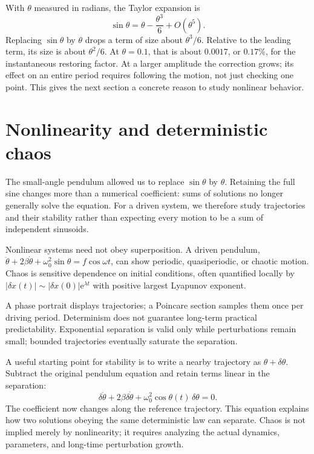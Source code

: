 \documentclass[11pt,oneside]{book}
\newcommand{\ee}{\mathrm{e}}
\theoremstyle{reviewstyle}
\begin{document}
With $\theta$ measured in radians, the Taylor expansion is
\begin{equation}
\sin\theta=\theta-\frac{\theta^3}{6}+O(\theta^5).
\end{equation}
Replacing $\sin\theta$ by $\theta$ drops a term of size about $\theta^3/6$. Relative to the leading term, its size is about $\theta^2/6$. At $\theta=0.1$, that is about $0.0017$, or $0.17\%$, for the instantaneous restoring factor. At a larger amplitude the correction grows; its effect on an entire period requires following the motion, not just checking one point. This gives the next section a concrete reason to study nonlinear behavior.

\section{Nonlinearity and deterministic chaos}
The small-angle pendulum allowed us to replace $\sin\theta$ by $\theta$. Retaining the full sine changes more than a numerical coefficient: sums of solutions no longer generally solve the equation. For a driven system, we therefore study trajectories and their stability rather than expecting every motion to be a sum of independent sinusoids.

Nonlinear systems need not obey superposition. A driven pendulum,
$\ddot\theta+2\beta\dot\theta+\omega_0^2\sin\theta=f\cos\omega t$,
can show periodic, quasiperiodic, or chaotic motion. Chaos is sensitive dependence on initial conditions, often quantified locally by
$|\delta x(t)|\sim|\delta x(0)|\ee^{\lambda t}$ with positive largest Lyapunov exponent.

A phase portrait displays trajectories; a Poincare section samples them once per driving period. Determinism does not guarantee long-term practical predictability. Exponential separation is valid only while perturbations remain small; bounded trajectories eventually saturate the separation.

A useful starting point for stability is to write a nearby trajectory as $\theta+\delta\theta$. Subtract the original pendulum equation and retain terms linear in the separation:
\begin{equation}
\delta\ddot\theta+2\beta\delta\dot\theta
+\omega_0^2\cos\theta(t)\,\delta\theta=0.
\end{equation}
The coefficient now changes along the reference trajectory. This equation explains how two solutions obeying the same deterministic law can separate. Chaos is not implied merely by nonlinearity; it requires analyzing the actual dynamics, parameters, and long-time perturbation growth.
\end{document}
